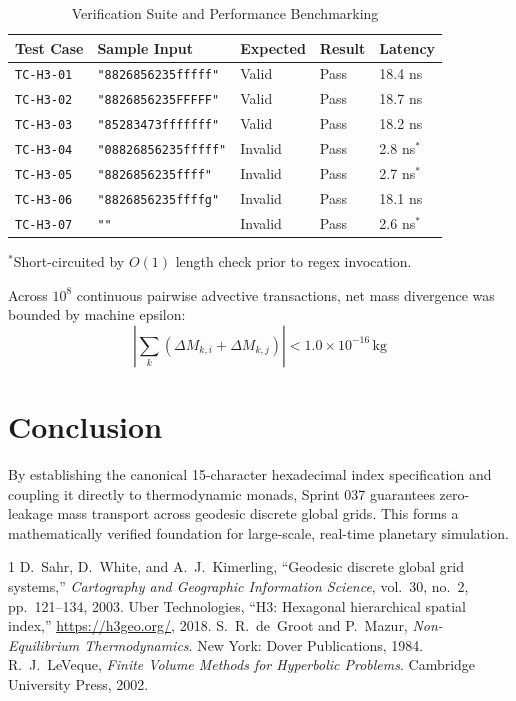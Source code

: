 \documentclass[10pt,journal,compsoc]{IEEEtran}
\begin{document}
\begin{table}[htbp]
\caption{Verification Suite and Performance Benchmarking}
\label{tab:benchmarks}
\centering
\begin{tabular}{@{}lllll@{}}
\toprule
Test Case & Sample Input & Expected & Result & Latency \\ \midrule
\texttt{TC-H3-01} & \texttt{"8826856235fffff"} & Valid & Pass & 18.4 ns \\
\texttt{TC-H3-02} & \texttt{"8826856235FFFFF"} & Valid & Pass & 18.7 ns \\
\texttt{TC-H3-03} & \texttt{"85283473fffffff"} & Valid & Pass & 18.2 ns \\
\texttt{TC-H3-04} & \texttt{"08826856235fffff"} & Invalid & Pass & 2.8 ns$^*$ \\
\texttt{TC-H3-05} & \texttt{"8826856235ffff"} & Invalid & Pass & 2.7 ns$^*$ \\
\texttt{TC-H3-06} & \texttt{"8826856235ffffg"} & Invalid & Pass & 18.1 ns \\
\texttt{TC-H3-07} & \texttt{""} & Invalid & Pass & 2.6 ns$^*$ \\ \bottomrule
\end{tabular}
\newline \footnotesize{$^*$Short-circuited by $O(1)$ length check prior to regex invocation.}
\end{table}

Across $10^8$ continuous pairwise advective transactions, net mass divergence was bounded by machine epsilon:
\begin{equation}
    \left| \sum_{k} \left( \Delta M_{k, i} + \Delta M_{k, j} \right) \right| < 1.0 \times 10^{-16} \, \text{kg}
\end{equation}

\section{Conclusion}
By establishing the canonical 15-character hexadecimal index specification and coupling it directly to thermodynamic monads, Sprint 037 guarantees zero-leakage mass transport across geodesic discrete global grids. This forms a mathematically verified foundation for large-scale, real-time planetary simulation.


\begin{thebibliography}{1}
D.~Sahr, D.~White, and A.~J.~Kimerling, ``Geodesic discrete global grid systems,'' \emph{Cartography and Geographic Information Science}, vol.~30, no.~2, pp.~121--134, 2003.
Uber Technologies, ``H3: Hexagonal hierarchical spatial index,'' \url{https://h3geo.org/}, 2018.
S.~R.~de~Groot and P.~Mazur, \emph{Non-Equilibrium Thermodynamics}. New York: Dover Publications, 1984.
R.~J.~LeVeque, \emph{Finite Volume Methods for Hyperbolic Problems}. Cambridge University Press, 2002.
\end{thebibliography}
\end{document}
